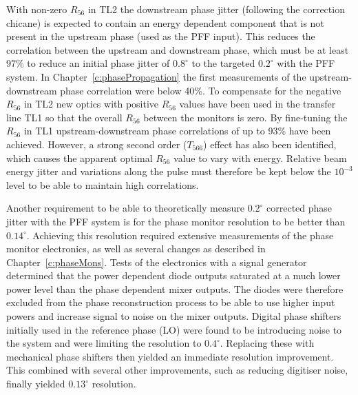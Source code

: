 With non-zero \(R_{56}\) in TL2 the downstream phase jitter (following the correction chicane) is expected to contain an energy dependent component that is not present in the upstream phase (used as the PFF input). This reduces the correlation between the upstream and downstream phase, which must be at least 97\% to reduce an initial phase jitter of \(0.8^\circ\) to the targeted \(0.2^\circ\) with the PFF system. In Chapter~\ref{c:phasePropagation} the first measurements of the upstream-downstream phase correlation were below 40\%. To compensate for the negative \(R_{56}\) in TL2 new optics with positive \(R_{56}\) values have been used in the transfer line TL1 so that the overall \(R_{56}\) between the monitors is zero. By fine-tuning the \(R_{56}\) in TL1 upstream-downstream phase correlations of up to 93\% have been achieved. However, a strong second order (\(T_{566}\)) effect has also been identified, which causes the apparent optimal \(R_{56}\) value to vary with energy. Relative beam energy jitter and variations along the pulse must therefore be kept below the \(10^{-3}\) level to be able to maintain high correlations. 

Another requirement to be able to theoretically measure \(0.2^\circ\) corrected phase jitter with the PFF system is for the phase monitor resolution to be better than \(0.14^\circ\). Achieving this resolution required extensive measurements of the phase monitor electronics, as well as several changes as described in Chapter~\ref{c:phaseMons}. Tests of the electronics with a signal generator determined that the power dependent diode outputs saturated at a much lower power level than the phase dependent mixer outputs. The diodes were therefore excluded from the phase reconstruction process to be able to use higher input powers and increase signal to noise on the mixer outputs. Digital phase shifters initially used in the reference phase (LO) were found to be introducing noise to the system and were limiting the resolution to \(0.4^\circ\). Replacing these with mechanical phase shifters then yielded an immediate resolution improvement. This combined with several other improvements, such as reducing digitiser noise, finally yielded \(0.13^\circ\) resolution.

